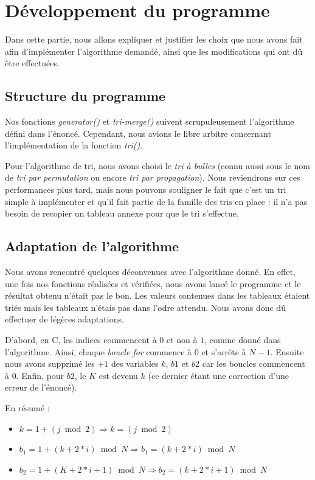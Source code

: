 \documentclass[12pt]{article}
\begin{document}
\section{Développement du programme}

Dans cette partie, nous allons expliquer et justifier les choix que nous avons
fait afin d'implémenter l'algorithme demandé, ainsi que les modifications qui
ont dû être effectuées.

\subsection{Structure du programme}

Nos fonctions \emph{generator()} et \emph{tri-merge()} suivent scrupuleusement
l'algorithme défini dans l'énoncé. Cependant, nous avions le libre arbitre
concernant l'implémentation de la fonction \emph{tri()}.
    
Pour l'algorithme de tri, nous avons choisi le \emph{tri à bulles} (connu aussi
sous le nom de \emph{tri par permutation} ou encore \emph{tri par propagation}).
Nous reviendrons sur ces performances plus tard, mais nous pouvons souligner le
fait que c'est un tri simple à implémenter et qu'il fait partie de la famille
des tris en place : il n'a pas besoin de recopier un tableau annexe pour que le
tri s'effectue. 

\subsection{Adaptation de l'algorithme}

Nous avons rencontré quelques déconvenues avec l'algorithme donné. En effet, une
fois nos fonctions réalisées et vérifiées, nous avons lancé le programme et le
résultat obtenu n'était pas le bon. Les valeurs contenues dans les tableaux
étaient triés mais les tableaux n'étais pas dans l'odre attendu. Nous avons donc
dû effectuer de légères adaptations.

D'abord, en C, les indices commencent à $0$ et non à $1$, comme donné dans
l'algorithme. Ainsi, chaque \emph{boucle for} commence à $0$ et s'arrête à
$N-1$. Ensuite nous avons supprimé les $+1$ des variables $k$, $b1$ et $b2$ car
les boucles commencent à 0. Enfin, pour $b2$, le $K$ est devenu $k$ (ce dernier
étant une correction d'une erreur de l'énoncé). 

En résumé :
\begin{itemize}
    \item $k = 1+(j\bmod 2) \Rightarrow k = (j\bmod 2)$
    \item $b_1 = 1+(k+2*i)\bmod N \Rightarrow b_1 = (k+2*i)\bmod N$
    \item $b_2 = 1+(K+2*i+1)\bmod N \Rightarrow b_2 = (k+2*i+1)\bmod N$
\end{itemize}
\end{document}
